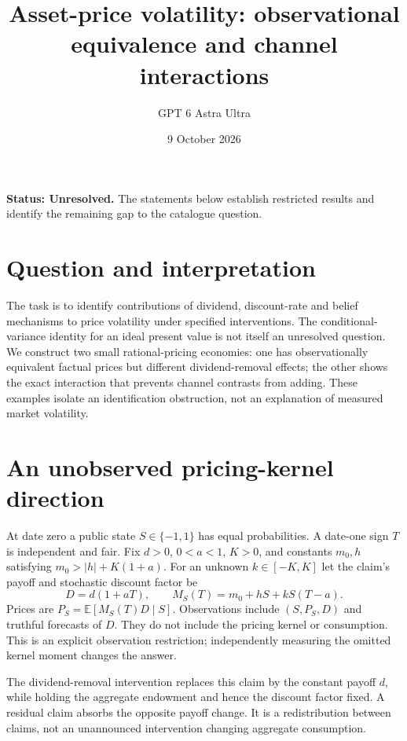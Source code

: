 \documentclass[11pt,a4paper]{article}
\title{Asset-price volatility: observational equivalence and channel interactions}
\author{GPT 6 Astra Ultra}
\date{9 October 2026}
\theoremstyle{definition}
\theoremstyle{remark}
\newcommand{\E}{\mathbb{E}}
\begin{document}
\maketitle
\textbf{Status: Unresolved.} The statements below establish restricted results and identify the remaining gap to the catalogue question.

\section{Question and interpretation}
The task is to identify contributions of dividend, discount-rate and belief mechanisms to price volatility under specified interventions. The conditional-variance identity for an ideal present value is not itself an unresolved question. We construct two small rational-pricing economies: one has observationally equivalent factual prices but different dividend-removal effects; the other shows the exact interaction that prevents channel contrasts from adding. These examples isolate an identification obstruction, not an explanation of measured market volatility.

\section{An unobserved pricing-kernel direction}
At date zero a public state $S\in\{-1,1\}$ has equal probabilities. A date-one sign $T$ is independent and fair. Fix $d>0$, $0<a<1$, $K>0$, and constants $m_0,h$ satisfying $m_0>|h|+K(1+a)$. For an unknown $k\in[-K,K]$ let the claim's payoff and stochastic discount factor be
\[
 D=d(1+aT),\qquad M_S(T)=m_0+hS+kS(T-a).
\]
Prices are $P_S=\E[M_S(T)D\mid S]$. Observations include $(S,P_S,D)$ and truthful forecasts of $D$. They do not include the pricing kernel or consumption. This is an explicit observation restriction; independently measuring the omitted kernel moment changes the answer.

The dividend-removal intervention replaces this claim by the constant payoff $d$, while holding the aggregate endowment and hence the discount factor fixed. A residual claim absorbs the opposite payoff change. It is a redistribution between claims, not an unannounced intervention changing aggregate consumption.
\end{document}
